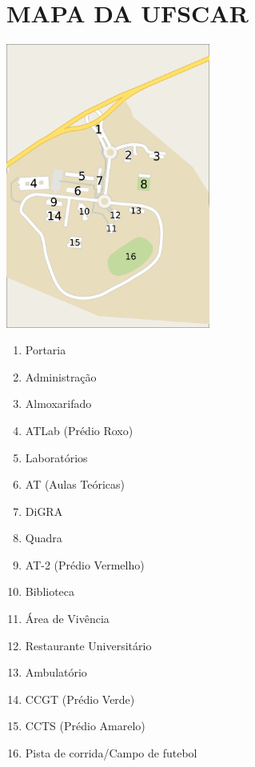 \begin{figure}
  \section{MAPA DA UFSCAR}
  \begin{vwcol}[widths={0.6,0.4}, rule=0pt]
    \includegraphics[width=0.6\textwidth]{./imagem/image.pdf}
    \vfill
    \begin{enumerate}
      \item Portaria
      \item Administração
      \item Almoxarifado
      \item ATLab (Prédio Roxo)
      \item Laboratórios
      \item AT (Aulas Teóricas)
      \item DiGRA
      \item Quadra
      \item AT-2 (Prédio Vermelho)
      \item Biblioteca
      \item Área de Vivência
      \item Restaurante Universitário
      \item Ambulatório
      \item CCGT (Prédio Verde)
      \item CCTS (Prédio Amarelo)
      \item Pista de corrida/Campo de futebol
    \end{enumerate}
  \end{vwcol}

\end{figure}

\restoregeometry

